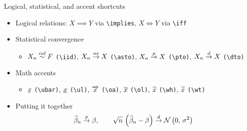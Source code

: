 \documentclass[10pt,itemsep]{beamer}
\begin{document}
\begin{frame}[t]
    {Logical, statistical, and accent shortcuts}
    \begin{itemize}
        \item Logical relations: $X \implies Y$ via \texttt{\textbackslash implies}, $X \iff Y$ via \texttt{\textbackslash iff}
        \item Statistical convergence
        \begin{itemize}
            \item $X_{n} \overset{iid}{\sim} F$ \texttt{(\textbackslash iid)}, $X_{n} \overset{as}{\to} X$ \texttt{(\textbackslash asto)}, $X_{n} \overset{p}{\to} X$ \texttt{(\textbackslash pto)}, $X_{n} \overset{d}{\to} X$ \texttt{(\textbackslash dto)}
        \end{itemize}
        \item Math accents
        \begin{itemize}
            \item $\ubar{x}$ \texttt{(\textbackslash ubar)}, $\underline{x}$ \texttt{(\textbackslash ul)}, $\overrightarrow{x}$ \texttt{(\textbackslash oa)}, $\overline{x}$ \texttt{(\textbackslash ol)}, $\widehat{x}$ \texttt{(\textbackslash wh)}, $\widetilde{x}$ \texttt{(\textbackslash wt)}
        \end{itemize}
        \item Putting it together
        \begin{equation*}
            \widehat{\beta}_{n} \overset{p}{\to} \beta, \qquad \sqrt{n}\,\left( \widehat{\beta}_{n} - \beta \right) \overset{d}{\to} \mathcal{N}\left( 0,\, \sigma^{2} \right)
        \end{equation*}
    \end{itemize}
\end{frame}
\end{document}
